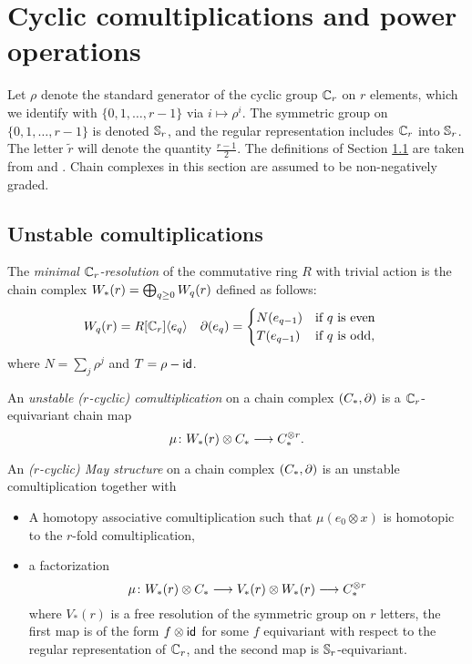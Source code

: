 \section{Cyclic comultiplications and power operations} \label{s:2bcomultiplications}

Let $\rho$ denote the standard generator of the cyclic group $\Cyc_r$ on $r$ elements, which we identify with $\{0,1,\ldots,r-1\}$ via $i\mapsto \rho^i$. The symmetric group on $\{0,1,\ldots,r-1\}$ is denoted $\Sym_r$, and the regular representation includes $\Cyc_r$ into $\Sym_r$. The letter $\tilde{r}$ will denote the quantity $\frac{r-1}{2}$. The definitions of Section \ref{s:unstable} are taken from \cite{may1970general} and \cite{medina2021may_st}. Chain complexes in this section are assumed to be non-negatively graded.

\subsection{Unstable comultiplications}\label{s:unstable}

The \emph{minimal $\Cyc_r$-resolution} of the commutative ring $R$ with trivial action is the chain complex $\W(r) = \bigoplus_{q\geq 0} \W[q](r)$ defined as follows:
\begin{align*}
	\W[q](r) &= R[\Cyc_r]\langle e_q\rangle  &
	\partial(e_q) &= \begin{cases}
		N(e_{q-1}) & \text{if $q$ is even} \\
		T(e_{q-1}) & \text{if $q$ is odd,}
	\end{cases}
\end{align*}
where $N = \sum_j \rho^j$ and $T = \rho - \Id$. 

\begin{definition} An \emph{unstable ($r$-cyclic) comultiplication} on a chain complex $(\ucadenas,\partial)$ is a $\Cyc_r$-equivariant chain map
\[\mu\colon \W(r)\otimes \ucadenas\lra \ucadenas^{\otimes r}.\]
\end{definition}

\begin{definition}
	An \emph{($r$-cyclic) May structure} on a chain complex $(\ucadenas,\partial)$ is an unstable comultiplication together with
	\begin{itemize}
		\item A homotopy associative comultiplication such that $\mu(e_0\otimes x)$ is homotopic to the $r$-fold comultiplication,
		\item a factorization 
	\[
		\mu\colon \W(r)\otimes \ucadenas\lra V_*(r)\otimes \W(r)\lra  \ucadenas^{\otimes r}
	\]
where $V_*(r)$ is a free resolution of the symmetric group on $r$ letters, the first map is of the form $f\otimes \id$ for some $f$ equivariant with respect to the regular representation of $\Cyc_r$, and the second map is $\Sym_r$-equivariant.
	\end{itemize}
\end{definition}


